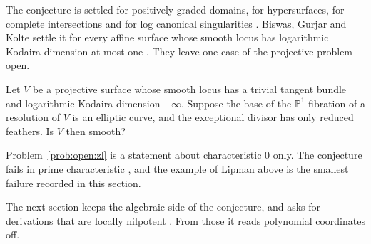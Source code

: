 The conjecture is settled for positively graded domains, for hypersurfaces, for
complete intersections and for log canonical singularities
\cite[p.~270]{BiswasGurjarKolte2014}. Biswas, Gurjar and Kolte settle it for
every affine surface whose smooth locus has logarithmic Kodaira dimension at
most one \cite[Theorem~1.2, p.~270]{BiswasGurjarKolte2014}. They leave one
case of the projective problem open. %

\begin{problem}\label{prob:open:zl-projective}
Let $V$ be a projective surface whose smooth locus has a trivial tangent bundle
and logarithmic Kodaira dimension $-\infty$.
Suppose the base of the $\mathbb{P}^1$-fibration of a resolution of $V$ is an
elliptic curve, and the exceptional divisor has only reduced feathers.
Is $V$ then smooth?
\end{problem}

Problem~\ref{prob:open:zl} is a statement about characteristic $0$ only.
The conjecture fails in prime characteristic
\cite[p.~116]{Graf2022LZPosChar}, and the example of Lipman above is the
smallest failure recorded in this section. %

The next section keeps the algebraic side of the conjecture, and asks for
derivations that are locally nilpotent
\cite[Theorem, p.~47]{FerreroLequainNowicki1992}. From those it reads
polynomial coordinates off.
